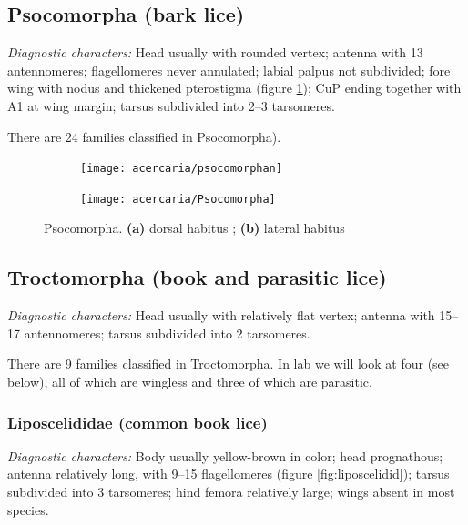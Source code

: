 \subsection{Psocomorpha (bark lice)}
\noindent{}\textit{Diagnostic characters:} Head usually with rounded vertex; antenna with 13 antennomeres; flagellomeres never annulated; labial palpus not subdivided; fore wing with nodus and thickened pterostigma (figure \ref{fig:psocids}); CuP ending together with A1 at wing margin; tarsus subdivided into 2--3 tarsomeres.\vspace{3mm}

\noindent{}There are 24 families classified in Psocomorpha).

\begin{figure}[ht!]
 \centering
\begin{subfigure}[ht!]{0.45\textwidth}
 \texttt{[image: acercaria/psocomorphan]}
 \caption{}
 \label{fig:psocids}
\end{subfigure}
 \hfill 
\begin{subfigure}[ht!]{0.5\textwidth}
 \texttt{[image: acercaria/Psocomorpha]}
 \caption{}
 \label{fig:psocids1}
\end{subfigure}
 \caption{Psocomorpha. \textbf{(a)} dorsal habitus \citep[][Fig. 19]{bhlitem37577}; \textbf{(b)} lateral habitus \citep[][Fig. 40]{bhlitem105840ross}}\label{fig:psocids2}
\end{figure}


\subsection{Troctomorpha (book and parasitic lice)}
\noindent{}\textit{Diagnostic characters:} Head usually with relatively flat vertex; antenna with 15--17 antennomeres; tarsus subdivided into 2 tarsomeres.\vspace{3mm}

\noindent{}There are 9 families classified in Troctomorpha. In lab we will look at four (see below), all of which are wingless and three of which are parasitic.

\subsubsection{Liposcelididae (common book lice)}
\noindent{}\textit{Diagnostic characters:} Body usually yellow-brown in color; head prognathous; antenna relatively long, with 9--15 flagellomeres (figure \ref{fig:liposcelidid}); tarsus subdivided into 3 tarsomeres; hind femora relatively large; wings absent in most species.\vspace{3mm}

